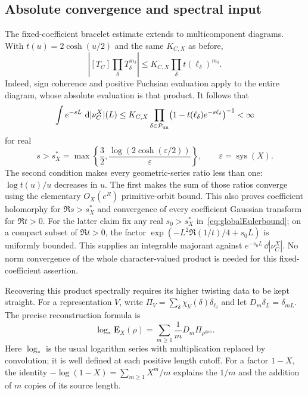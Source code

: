 \subsection{Absolute convergence and spectral input}

The fixed-coefficient bracelet estimate extends to multicomponent
diagrams. With $t(u)=2\cosh(u/2)$ and the same $K_{C,X}$ as before,
\[
 \left|[T_C]\prod_\delta T_\delta^{m_\delta}\right|
 \leq K_{C,X}\prod_\delta t(\ell_\delta)^{m_\delta}.
\]
Indeed, sign coherence and positive Fuchsian evaluation apply to
the entire diagram, whose absolute evaluation is that product.
It follows that
\begin{equation}
 \int e^{-sL}\,\mathop{}\!\mathrm d|\nu_C^X|(L)
 \leq K_{C,X}
 \prod_{\delta\in\mathcal P_{\rm un}}
 \bigl(1-t(\ell_\delta)e^{-s\ell_\delta}\bigr)^{-1}
 <\infty
 \label{eq:globalEulerbound}
\end{equation}
for real
\begin{equation}
 s>s_X^*=
 \max\left\{\frac32,
       \frac{\log(2\cosh(\varepsilon/2))}{\varepsilon}\right\},
 \qquad \varepsilon=\operatorname{sys}(X).
 \label{eq:globalEulerhalfplane}
\end{equation}
The second condition makes every geometric-series ratio less
than one: $\log t(u)/u$ decreases in $u$. The first makes the
sum of those ratios converge using the elementary $O_X(e^R)$
primitive-orbit bound. This also proves coefficient holomorphy
for $\Re s>s_X^*$ and convergence of every coefficient Gaussian
transform for $\Re t>0$. For the latter claim fix any real
$s_0>s_X^*$ in~\eqref{eq:globalEulerbound}; on a compact subset
of $\Re t>0$, the factor
$\exp(-L^2\Re(1/t)/4+s_0L)$ is uniformly bounded. This supplies
an integrable majorant against $e^{-s_0L}\,\dd|\nu_C^X|$.
No norm convergence of the whole character-valued product is
needed for this fixed-coefficient assertion.

Recovering this product spectrally requires its higher twisting
data to be kept straight. For a representation $V$, write
$\Pi_V=\sum_\delta\chi_V(\delta)\delta_{\ell_\delta}$ and let
$D_m\delta_L=\delta_{mL}$. The precise reconstruction formula is
\begin{equation}
 \boxed{
 \log_*\mathbf E_X(\rho)
 =\sum_{m\geq1}\frac1m D_m\Pi_{\rho^{\otimes m}}.
 }
 \label{eq:globalEulerinput}
\end{equation}
Here $\log_*$ is the usual logarithm series with multiplication
replaced by convolution; it is well defined at each positive length
cutoff. For a factor $1-X$, the identity
$-\log(1-X)=\sum_{m\ge1}X^m/m$ explains the $1/m$ and the
addition of $m$ copies of its source length.

